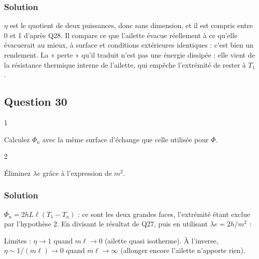 \documentclass[11pt,a4paper]{article}
\newcommand{\equationajustee}[1]{%
  \sbox{\boiteequation}{$\displaystyle #1$}%
  \ifdim\wd\boiteequation>\linewidth
    \[\resizebox{\linewidth}{!}{\usebox{\boiteequation}}\]%
  \else
    \[#1\]%
  \fi}
\begin{document}
\hypertarget{solution-28}{%
\subsubsection{Solution}\label{solution-28}}

\(\eta\) est le quotient de deux puissances, donc sans dimension, et il est compris entre 0 et 1 d'après Q28. Il compare ce que l'ailette évacue réellement à ce qu'elle évacuerait au mieux, à surface et conditions extérieures identiques : c'est bien un rendement. La « perte » qu'il traduit n'est pas une énergie dissipée : elle vient de la résistance thermique interne de l'ailette, qui empêche l'extrémité de rester à \(T_1\).

\hypertarget{question-30}{%
\subsection{Question 30}\label{question-30}}

\begin{indication}{1}

Calculez \(\Phi_u\) avec la même surface d'échange que celle utilisée pour \(\Phi\).

\end{indication}

\begin{indication}{2}

Éliminez \(\lambda e\) grâce à l'expression de \(m^2\).

\end{indication}

\hypertarget{solution-29}{%
\subsubsection{Solution}\label{solution-29}}

\(\Phi_u=2hL\ell(T_1-T_a)\) : ce sont les deux grandes faces, l'extrémité étant exclue par l'hypothèse 2. En divisant le résultat de Q27, puis en utilisant \(\lambda e=2h/m^2\) :

\equationajustee{\begin{aligned}
\eta&=\frac{\lambda Le\,m\tanh(m\ell)}{2hL\ell}\\
&=\frac{\lambda e\,m}{2h\ell}\tanh(m\ell)\\
&=\boxed{\frac{\tanh(m\ell)}{m\ell}}
\end{aligned}}

Limites : \(\eta\to1\) quand \(m\ell\to0\) (ailette quasi isotherme). À l'inverse, \(\eta\sim1/(m\ell)\to0\) quand \(m\ell\to\infty\) (allonger encore l'ailette n'apporte rien).
\end{document}
